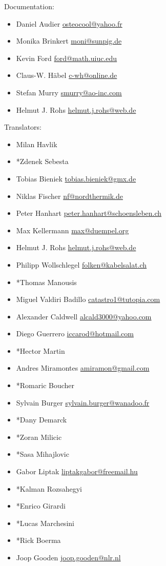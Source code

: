 Documentation:
\begin{itemize}
\item Daniel Audier \url{osteocool@yahoo.fr}
\item Monika Brinkert \url{moni@sunpig.de}
\item Kevin Ford \url{ford@math.uiuc.edu}
\item Claus-W. Häbel \url{c-wh@online.de}
\item Stefan Murry \url{smurry@ao-inc.com}
\item Helmut J. Rohs \url{helmut.j.rohs@web.de}
\end{itemize}


Translators:
\begin{itemize}
\item Milan Havlik
\item*Zdenek Sebesta
\item Tobias Bieniek \url{tobias.bieniek@gmx.de}
\item Niklas Fischer \url{nf@nordthermik.de}
\item Peter Hanhart \url{peter.hanhart@schoensleben.ch}
\item Max Kellermann \url{max@duempel.org}
\item Helmut J. Rohs \url{helmut.j.rohs@web.de}
\item Philipp Wollschlegel \url{folken@kabelsalat.ch}
\item*Thomas Manousis
\item Miguel Valdiri Badillo \url{catastro1@tutopia.com}
\item Alexander Caldwell \url{alcald3000@yahoo.com}
\item Diego Guerrero \url{iccarod@hotmail.com}
\item*Hector Martin
\item Andres Miramontes \url{amiramon@gmail.com}
\item*Romaric Boucher
\item Sylvain Burger \url{sylvain.burger@wanadoo.fr}
\item*Dany Demarck
\item*Zoran Milicic
\item*Sasa Mihajlovic
\item Gabor Liptak \url{liptakgabor@freemail.hu}
\item*Kalman Rozsahegyi
\item*Enrico Girardi
\item*Lucas Marchesini
\item*Rick Boerma
\item Joop Gooden \url{joop.gooden@nlr.nl}

\end{itemize}
